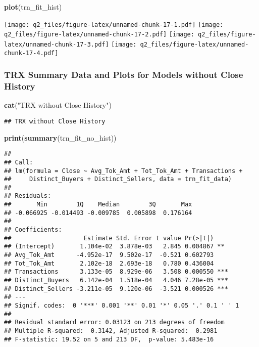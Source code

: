 \documentclass[]{article}
\newenvironment{Shaded}{\begin{snugshade}}{\end{snugshade}}
\newcommand{\KeywordTok}[1]{\textcolor[rgb]{0.13,0.29,0.53}{\textbf{#1}}}
\newcommand{\StringTok}[1]{\textcolor[rgb]{0.31,0.60,0.02}{#1}}
\newcommand{\NormalTok}[1]{#1}
\begin{document}
\begin{Shaded}
\begin{Highlighting}[]
\KeywordTok{plot}\NormalTok{(trn_fit_hist)}
\end{Highlighting}
\end{Shaded}

\texttt{[image: q2\_files/figure-latex/unnamed-chunk-17-1.pdf]}
\texttt{[image: q2\_files/figure-latex/unnamed-chunk-17-2.pdf]}
\texttt{[image: q2\_files/figure-latex/unnamed-chunk-17-3.pdf]}
\texttt{[image: q2\_files/figure-latex/unnamed-chunk-17-4.pdf]}

\subsubsection{TRX Summary Data and Plots for Models without Close
History}\label{trx-summary-data-and-plots-for-models-without-close-history}

\begin{Shaded}
\begin{Highlighting}[]
\KeywordTok{cat}\NormalTok{(}\StringTok{"TRX without Close History"}\NormalTok{)}
\end{Highlighting}
\end{Shaded}

\begin{verbatim}
## TRX without Close History
\end{verbatim}

\begin{Shaded}
\begin{Highlighting}[]
\KeywordTok{print}\NormalTok{(}\KeywordTok{summary}\NormalTok{(trn_fit_no_hist))}
\end{Highlighting}
\end{Shaded}

\begin{verbatim}
## 
## Call:
## lm(formula = Close ~ Avg_Tok_Amt + Tot_Tok_Amt + Transactions + 
##     Distinct_Buyers + Distinct_Sellers, data = trn_fit_data)
## 
## Residuals:
##       Min        1Q    Median        3Q       Max 
## -0.066925 -0.014493 -0.009785  0.005898  0.176164 
## 
## Coefficients:
##                    Estimate Std. Error t value Pr(>|t|)    
## (Intercept)       1.104e-02  3.878e-03   2.845 0.004867 ** 
## Avg_Tok_Amt      -4.952e-17  9.502e-17  -0.521 0.602793    
## Tot_Tok_Amt       2.102e-18  2.693e-18   0.780 0.436004    
## Transactions      3.133e-05  8.929e-06   3.508 0.000550 ***
## Distinct_Buyers   6.142e-04  1.518e-04   4.046 7.28e-05 ***
## Distinct_Sellers -3.211e-05  9.120e-06  -3.521 0.000526 ***
## ---
## Signif. codes:  0 '***' 0.001 '**' 0.01 '*' 0.05 '.' 0.1 ' ' 1
## 
## Residual standard error: 0.03123 on 213 degrees of freedom
## Multiple R-squared:  0.3142, Adjusted R-squared:  0.2981 
## F-statistic: 19.52 on 5 and 213 DF,  p-value: 5.483e-16
\end{verbatim}
\end{document}
